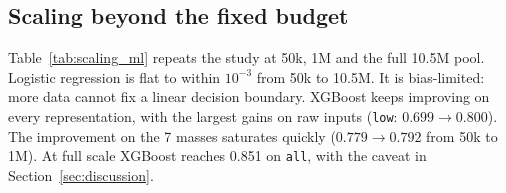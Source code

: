 \subsection{Scaling beyond the fixed budget}

Table~\ref{tab:scaling_ml} repeats the study at 50k, 1M and the full 10.5M pool. Logistic
regression is flat to within $10^{-3}$ from 50k to 10.5M. It is bias-limited: more data cannot fix a
linear decision boundary. XGBoost keeps improving on every representation, with the largest gains on
raw inputs (\texttt{low}: $0.699\to0.800$). The improvement on the 7 masses saturates quickly
($0.779\to0.792$ from 50k to 1M). At full scale XGBoost reaches 0.851 on \texttt{all}, with the
caveat in Section~\ref{sec:discussion}.

